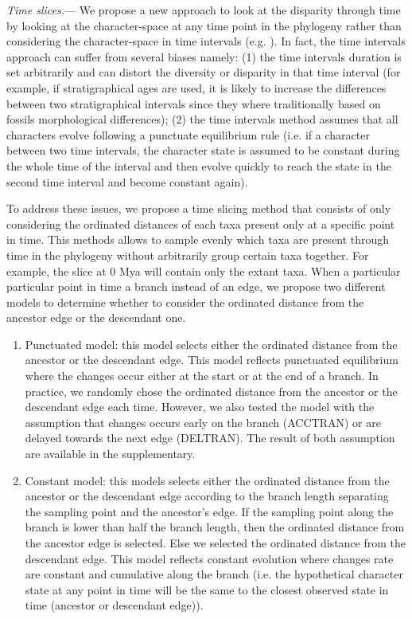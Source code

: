 \documentclass[12pt,letterpaper]{article}
\renewcommand{\subsubsection}[1]{%
\vspace{2ex}
\noindent
\textit{#1.}---}
\begin{document}
\subsubsection{Time slices}
We propose a new approach to look at the disparity through time by looking at the character-space at any time point in the phylogeny rather than considering the character-space in time intervals (e.g. \cite{Brusatte12092008,brusattedinosaur2012,toljagictriassic-jurassic2013}). In fact, the time intervals approach can suffer from several biases namely: (1) the time intervals duration is set arbitrarily and can distort the diversity or disparity in that time interval (for example, if stratigraphical ages are used, it is likely to increase the differences between two stratigraphical intervals since they where traditionally based on fossils morphological differences); (2) the time intervals method assumes that all characters evolve following a punctuate equilibrium rule (i.e. if a character between two time intervals, the character state is assumed to be constant during the whole time of the interval and then evolve quickly to reach the state in the second time interval and become constant again).

To address these issues, we propose a time slicing method that consists of only considering the ordinated distances of each taxa present only at a specific point in time. This methods allows to sample evenly which taxa are present through time in the phylogeny without arbitrarily group certain taxa together. For example, the slice at 0 Mya will contain only the extant taxa. When a particular particular point in time a branch instead of an edge, we propose two different models to determine whether to consider the ordinated distance from the ancestor edge or the descendant one.
\begin{enumerate}
\item{Punctuated model:} this model selects either the ordinated distance from the ancestor or the descendant edge. This model reflects punctuated equilibrium where the changes occur either at the start or at the end of a branch. In practice, we randomly chose the ordinated distance from the ancestor or the descendant edge each time. However, we also tested the model with the assumption that changes occurs early on the branch (ACCTRAN) or are delayed towards the next edge (DELTRAN). The result of both assumption are available in the supplementary.
\item{Constant model:} this models selects either the ordinated distance from the ancestor or the descendant edge according to the branch length separating the sampling point and the ancestor's edge. If the sampling point along the branch is lower than half the branch length, then the ordinated distance from the ancestor edge is selected. Else we selected the ordinated distance from the descendant edge. This model reflects constant evolution where changes rate are constant and cumulative along the branch (i.e. the hypothetical character state at any point in time will be the same to the closest observed state in time (ancestor or descendant edge)).
\end{enumerate}
\end{document}
